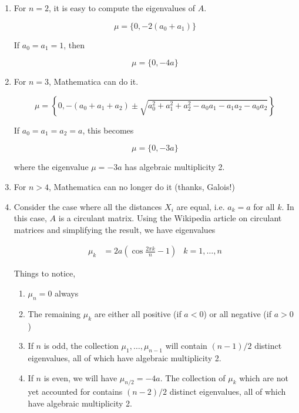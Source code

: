 \documentclass[12pt]{article}
\begin{document}
\begin{enumerate}

\item For $n = 2$, it is easy to compute the eigenvalues of $A$.

\[
\mu = \{ 0, -2(a_0 + a_1) \}
\]

If $a_0 = a_1 = 1$, then

\[
\mu = \{ 0, -4 a \}
\]

\item For $n = 3$, Mathematica can do it.

\[
\mu = \left\{0,  -(a_0 + a_1 + a_2) \pm 
\sqrt{ a_0^2 + a_1^2 + a_2^2 - a_0 a_1 - a_1 a_2 - a_0 a_2 }\right\}
\]

If $a_0 = a_1 = a_2 = a$, this becomes

\[
\mu = \{0,  -3a \}
\]

where the eigenvalue $\mu = -3a$ has algebraic multiplicity 2.

\item For $n > 4$, Mathematica can no longer do it (thanks, Galois!) 

\item Consider the case where all the distances $X_i$ are equal, i.e. $a_k = a$ for all $k$. In this case, $A$ is a circulant matrix. Using the Wikipedia article on circulant matrices and simplifying the result, we have eigenvalues

\begin{align*}
\mu_k &= 2 a\left( \cos \frac{2 \pi k}{n}  - 1 \right) & k = 1, \dots, n
\end{align*}

Things to notice,

\begin{enumerate}
	\item $\mu_n = 0$ always
	\item The remaining $\mu_k$ are either all positive (if $a < 0$) or all negative (if $a > 0$)
	\item If $n$ is odd, the collection $\mu_1, \dots, \mu_{n-1}$ will contain $(n-1)/2$ distinct eigenvalues, all of which have algebraic multiplicity 2.
	\item If $n$ is even, we will have $\mu_{n/2} = -4a$. The collection of $\mu_k$ which are not yet accounted for contains $(n-2)/2$ distinct eigenvalues, all of which have algebraic multiplicity 2.
\end{enumerate}

\end{enumerate}
\end{document}
